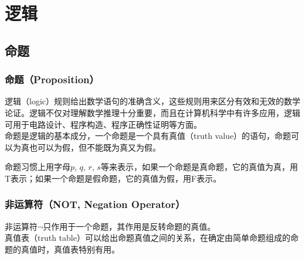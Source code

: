 \chapter{逻辑}

\section{命题}

\subsection{命题（Proposition）}

逻辑（logic）规则给出数学语句的准确含义，这些规则用来区分有效和无效的数学论证。逻辑不仅对理解数学推理十分重要，而且在计算机科学中有许多应用，逻辑可用于电路设计、程序构造、程序正确性证明等方面。\\

命题是逻辑的基本成分，一个命题是一个具有真值（truth value）的语句，命题可以为真也可以为假，但不能既为真又为假。

\begin{table}[H]
	\centering
	\caption{命题与非命题}
\end{table}

命题习惯上用字母$ p $, $ q $, $ r $, $ s $等来表示，如果一个命题是真命题，它的真值为真，用T表示；如果一个命题是假命题，它的真值为假，用F表示。\\

\subsection{非运算符（NOT, Negation Operator）}

非运算符$ \neg $只作用于一个命题，其作用是反转命题的真值。\\

真值表（truth table）可以给出命题真值之间的关系，在确定由简单命题组成的命题的真值时，真值表特别有用。

